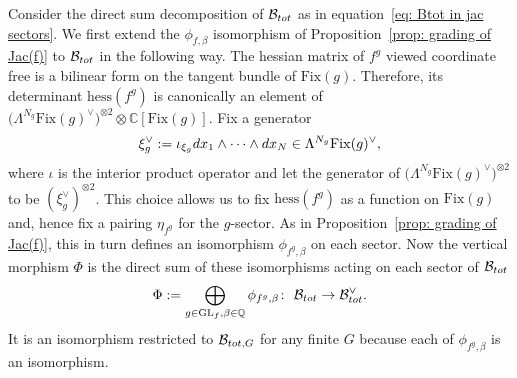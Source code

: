 \documentclass[10pt,a4paper]{article}
\numberwithin{equation}{section}
\newcommand{\QQ}{{\mathbb{Q}}}
\newcommand{\GL}{{\mathrm{GL}}}
\newcommand{\Fix}{\mathrm{Fix}}
\newcommand{\hess}{\mathrm{hess}}
\def\B{{\mathcal B}}
\newcommand\iot{\iota}
\begin{document}
Consider the direct sum decomposition of $\B_{\rm tot}$ as in equation~\eqref{eq: Btot in jac sectors}. We first extend the $\phi_{f,\beta}$ isomorphism of Proposition~\ref{prop: grading of Jac(f)} to $\B_{\rm tot}$ in the following way. The hessian matrix of $f^g$ viewed coordinate free is a bilinear form on the tangent bundle of $\Fix(g)$. Therefore, its determinant $\hess(f^g)$ is canonically an element of $\bigl(\Lambda^{N_g} \Fix(g)^\vee\bigr)^{\otimes 2}\otimes \mathbb{C}[\Fix(g)]$. Fix a generator \[\xi^\vee_g:=\iot_{\xi_g}{\rm d}x_1\wedge\cdots\wedge {\rm d}x_N\in\Lambda^{N_g} \Fix(g)^\vee,\] where $\iot$ is the interior product operator and let the generator of $\bigl(\Lambda^{N_g}\Fix(g)^\vee\bigr)^{\otimes 2}$ to be $(\xi^\vee_g)^{\otimes 2}$. This choice allows us to fix $\hess(f^g)$ as a function on $\Fix(g)$ and, hence fix a pairing $\eta_{f^g}$ for the $g$-sector. As in Proposition~\ref{prop: grading of Jac(f)}, this in turn defines an isomorphism $\phi_{f^g,\beta}$ on each sector.
Now the vertical morphism $\Phi$ is the direct sum of these isomorphisms acting on each sector of $\B_{\rm tot}$
\[
	\Phi := \bigoplus_{g \in \GL_f,\beta\in\QQ} \phi_{f^g,\beta} \colon \ \B_{\rm tot}\to \B_{\rm tot}^\vee.
\]
It is an isomorphism restricted to $\B_{{\rm tot},G}$ for any finite $G$ because each of $\phi_{f^g,\beta}$ is an isomorphism.
\end{document}
